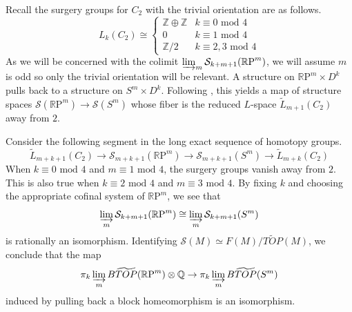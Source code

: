 \documentclass[11pt, twoside]{amsart}
\theoremstyle{plain}
\theoremstyle{definition}
\theoremstyle{remark}
\newcommand{\Q}{\mathbb Q}
\newcommand{\Z}{\mathbb Z}
\newcommand{\RP}{\mathbb R\text{P}}
\newcommand{\mc}[1]{\mathcal{{#1}}}
\begin{document}
Recall the surgery groups for $C_2$ with the trivial orientation are as follows.
\[
L_k(C_2)\cong\begin{cases}\Z\oplus\Z&k\equiv0\text{ mod }4\\0&k\equiv1\text{ mod }4\\\Z/2&k\equiv 2,3\text{ mod 4}\end{cases}
\]
As we will be concerned with the colimit $\varinjlim_m\mc{S}_{k+m+1}(\RP^m)$, we will assume $m$ is odd so only the trivial orientation will be relevant.
A structure on $\RP^m\times D^k$ pulls back to a structure on $S^m\times D^k$.
Following \cite{CappellWeinbergerSimpleAS}, this yields a map of structure spaces $\mc{S}(\RP^m)\rightarrow\mc{S}(S^m)$ whose fiber is the reduced $L$-space $\tilde{L}_{m+1}(C_2)$ away from $2$.

Consider the following segment in the long exact sequence of homotopy groups.
\[
\tilde{L}_{m+k+1}(C_2)\rightarrow\mc{S}_{m+k+1}(\RP^m)\rightarrow\mc{S}_{m+k+1}(S^m)\rightarrow\tilde{L}_{m+k}(C_2)
\]
When $k\equiv0\text{ mod }4$ and $m\equiv1\text{ mod }4$, the surgery groups vanish away from $2$.
This is also true when $k\equiv2\text{ mod }4$ and $m\equiv 3\text{ mod }4$.
By fixing $k$ and choosing the appropriate cofinal system of $\RP^m$, we see that
\[
\varinjlim_m\mc{S}_{k+m+1}(\RP^m)\cong\varinjlim_m\mc{S}_{k+m+1}(S^m)
\]
is rationally an isomorphism.
Identifying $\mc{S}(M)\simeq F(M)/\widetilde{TOP}(M)$, we conclude that the map
\[
\pi_k\varinjlim_mB\widetilde{TOP}(\RP^m)\otimes\Q\rightarrow\pi_k\varinjlim_m B\widetilde{TOP}(S^m)
\]
induced by pulling back a block homeomorphism is an isomorphism.
\end{document}
